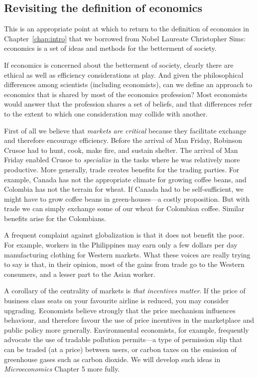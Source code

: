 

\subsection*{Revisiting the definition of economics}

This is an appropriate point at which to return to the definition of economics in Chapter~\ref{chap:intro} that we borrowed from Nobel Laureate Christopher Sims: economics is a set of ideas and methods for the betterment of society. 

If economics is concerned about the betterment of society, clearly there are ethical as well as efficiency considerations at play. And given the philosophical differences among scientists (including economists), can we define an approach to economics that is shared by most of the economics profession? Most economists would answer that the profession shares a set of beliefs, and that differences refer to the extent to which one consideration may collide with another.

First of all we believe that \textit{markets are critical} because they facilitate exchange and therefore encourage efficiency. Before the arrival of Man Friday, Robinson Crusoe had to hunt, cook, make fire, and sustain shelter. The arrival of Man Friday enabled Crusoe to \textit{specialize} in the tasks where he was relatively more productive. More generally, trade creates benefits for the trading parties. For example, Canada has not the appropriate climate for growing coffee beans, and Colombia has not the terrain for wheat. If Canada had to be self-sufficient, we might have to grow coffee beans in green-houses---a costly proposition. But with trade we can simply exchange some of our wheat for Colombian coffee. Similar benefits arise for the Colombians.

A frequent complaint against globalization is that it does not benefit the poor. For example, workers in the Philippines may earn only a few dollars per day manufacturing clothing for Western markets. What these voices are really trying to say is that, in their opinion, most of the gains from trade go to the Western consumers, and a lesser part to the Asian worker. 

A corollary of the centrality of markets is \textit{that incentives matter}. If the price of business class seats on your favourite airline is reduced, you may consider upgrading. Economists believe strongly that the price mechanism influences behaviour, and therefore favour the use of price incentives in the marketplace and public policy more generally. Environmental economists, for example, frequently advocate the use of tradable pollution permits---a type of permission slip that can be traded (at a price) between users, or carbon taxes on the emission of greenhouse gases such as carbon dioxide. We will develop such ideas in \textit{Microeconomics} Chapter 5 more fully.

